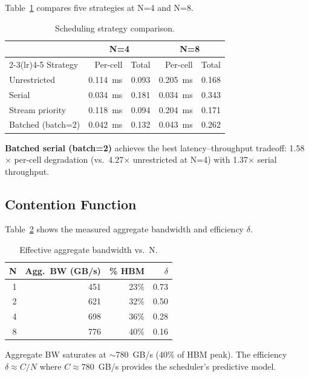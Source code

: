 Table~\ref{tab:eval_strategies} compares five strategies at N=4 and N=8.

\begin{table}[h]
\centering
\small
\caption{Scheduling strategy comparison.}
\label{tab:eval_strategies}
\begin{tabular}{@{}lrrrr@{}}
\toprule
 & \multicolumn{2}{c}{N=4} & \multicolumn{2}{c}{N=8} \\
\cmidrule(lr){2-3}\cmidrule(lr){4-5}
Strategy & Per-cell & Total & Per-cell & Total \\
\midrule
Unrestricted & 0.114~ms & 0.093 & 0.205~ms & 0.168 \\
Serial & 0.034~ms & 0.181 & 0.034~ms & 0.343 \\
Stream priority & 0.118~ms & 0.094 & 0.204~ms & 0.171 \\
Batched (batch=2) & 0.042~ms & 0.132 & 0.043~ms & 0.262 \\
\bottomrule
\end{tabular}
\end{table}

\textbf{Batched serial (batch=2)} achieves the best latency--throughput tradeoff: 1.58$\times$ per-cell degradation (vs.\ 4.27$\times$ unrestricted at N=4) with 1.37$\times$ serial throughput.

\subsection{Contention Function}

Table~\ref{tab:eval_bw} shows the measured aggregate bandwidth and efficiency $\delta$.

\begin{table}[h]
\centering
\small
\caption{Effective aggregate bandwidth vs.\ N.}
\label{tab:eval_bw}
\begin{tabular}{@{}rrrr@{}}
\toprule
N & Agg.\ BW (GB/s) & \% HBM & $\delta$ \\
\midrule
1 & 451 & 23\% & 0.73 \\
2 & 621 & 32\% & 0.50 \\
4 & 698 & 36\% & 0.28 \\
8 & 776 & 40\% & 0.16 \\
\bottomrule
\end{tabular}
\end{table}

Aggregate BW saturates at $\sim$780~GB/s (40\% of HBM peak). The efficiency $\delta \approx C/N$ where $C \approx 780$~GB/s provides the scheduler's predictive model.

